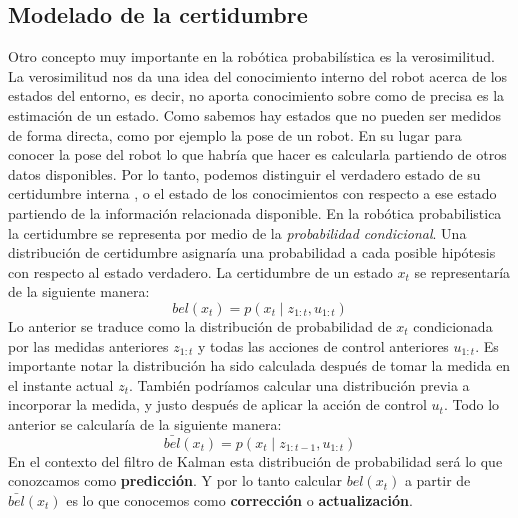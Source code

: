 \subsection{Modelado de la certidumbre}
Otro concepto muy importante en la robótica probabilística es la verosimilitud.
La verosimilitud nos da una idea del conocimiento interno del robot acerca de los estados del entorno, es decir, no aporta conocimiento sobre como de precisa es la estimación de un estado. 
%
%
%
Como sabemos hay estados que no pueden ser medidos de forma directa, como por ejemplo la pose de un robot. 
En su lugar para conocer la pose del robot lo que habría que hacer es calcularla partiendo de otros datos disponibles.
Por lo tanto, podemos distinguir el verdadero estado de su certidumbre interna , o el estado de los conocimientos con respecto a ese estado partiendo de la información relacionada disponible.
%
%
%
En la robótica probabilistica la certidumbre se representa por medio de la \textit{probabilidad condicional}.
Una distribución de certidumbre asignaría una probabilidad a cada posible hipótesis con respecto al estado verdadero.
La certidumbre de un estado $x_{t}$ se representaría de la siguiente manera:
%
%
%
%
%
\begin{equation}\label{dist_conf}
bel(x_{t}) = p(x_{t} \mid z_{1:t},u_{1:t})
\end{equation}
Lo anterior se traduce como la distribución de probabilidad de $x_{t}$ condicionada por las medidas anteriores $z_{1:t}$ y todas las acciones de control anteriores $u_{1:t}$.
Es importante notar la distribución ha sido calculada después de tomar la medida en el instante actual $z_{t}$.
También podríamos calcular una distribución previa a incorporar la medida, y justo después de aplicar la acción de control $u_{t}$.
Todo lo anterior se calcularía de la siguiente manera:
\begin{equation}\label{dist_conf_2}
\bar{bel}(x_{t}) = p(x_{t} \mid z_{1:t-1},u_{1:t})
\end{equation}
En el contexto del filtro de Kalman esta distribución de probabilidad será lo que conozcamos como \textbf{predicción}.
Y por lo tanto calcular $bel(x_{t})$ a partir de $\bar{bel}(x_{t})$ es lo que conocemos como \textbf{corrección} o \textbf{actualización}.

